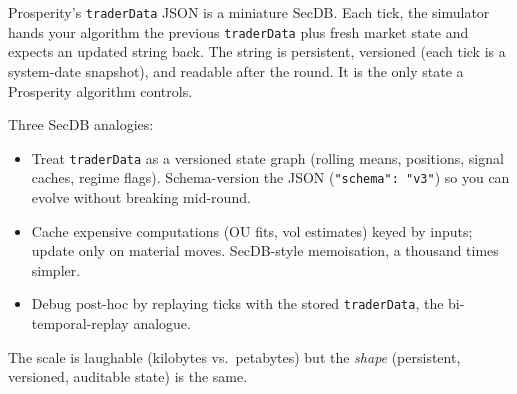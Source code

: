 \begin{prosperitybox}
Prosperity's \texttt{traderData} JSON is a miniature SecDB.  Each
tick, the simulator hands your algorithm the previous
\texttt{traderData} plus fresh market state and expects an updated
string back.  The string is persistent, versioned (each tick is a
system-date snapshot), and readable after the round.  It is the
only state a Prosperity algorithm controls.

Three SecDB analogies:
\begin{itemize}
  \item Treat \texttt{traderData} as a versioned state graph
    (rolling means, positions, signal caches, regime flags).
    Schema-version the JSON (\texttt{"schema": "v3"}) so you can
    evolve without breaking mid-round.
  \item Cache expensive computations (OU fits, vol estimates)
    keyed by inputs; update only on material moves.  SecDB-style
    memoisation, a thousand times simpler.
  \item Debug post-hoc by replaying ticks with the stored
    \texttt{traderData}, the bi-temporal-replay analogue.
\end{itemize}
The scale is laughable (kilobytes vs.\ petabytes) but the
\emph{shape} (persistent, versioned, auditable state) is
the same.
\end{prosperitybox}

